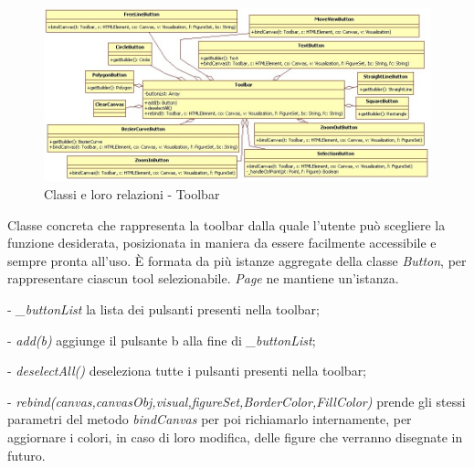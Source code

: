 \begin{figure}[!ht]
\centering
\includegraphics[scale=0.5]{toolbar.jpg}
\caption{Classi e loro relazioni - Toolbar}
\end{figure}

Classe concreta che rappresenta la toolbar dalla quale l'utente pu\` o scegliere la funzione desiderata, posizionata in maniera da essere facilmente accessibile e sempre pronta all'uso.
\` E formata da pi\`u istanze aggregate della classe \textit{Button}, per rappresentare ciascun tool selezionabile. 
\textit{Page} ne mantiene un'istanza.
\begin{elencopuntato}[\subsubsecindent]
\item[-] \textit{{\_}buttonList} la lista dei pulsanti presenti nella toolbar;
\end{elencopuntato}
\begin{elencopuntato}[\subsubsecindent]
\item[-]  \textit{add(b)} aggiunge il pulsante b alla fine di \textit{{\_}buttonList};
\item[-] \textit{deselectAll()} deseleziona tutte i pulsanti presenti nella toolbar;
\item[-] \textit{rebind(canvas,canvasObj,visual,figureSet,BorderColor,FillColor)} prende gli stessi parametri del metodo \textit{bindCanvas} per poi richiamarlo internamente, per aggiornare i colori, in caso di loro modifica, delle figure che verranno disegnate in futuro.
\end{elencopuntato}

